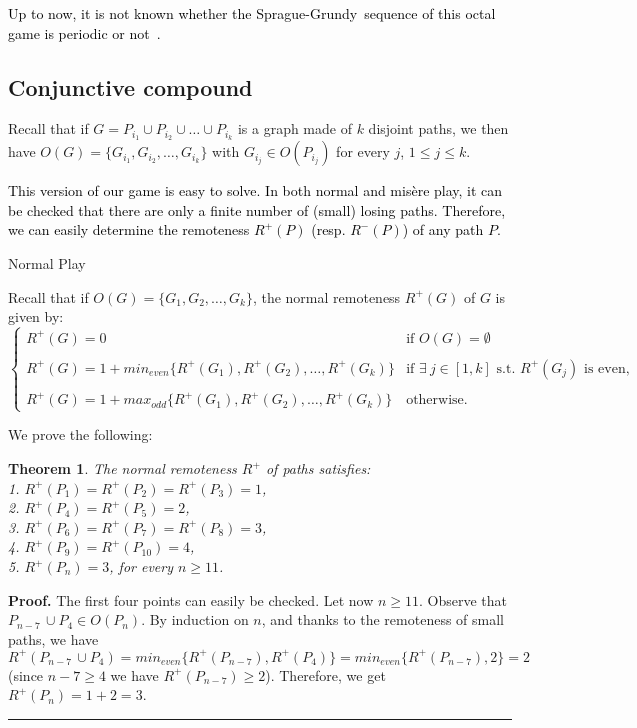 \documentclass[11pt]{article}
\newcommand{\modif}[1]{\textcolor{black}{#1}}
\newcommand{\centre}[1]{\begin{center}#1\end{center}}
\newcommand{\SP}{Sprague-Grundy}
\newtheorem{theorem}{Theorem}
\newcommand\qed{\mbox{}\hfill\rule{0.5em}{0.809em}\par\vskip 5mm}
\newenvironment{proof}[0]{\noindent\textbf{Proof.}}{\qed}
\begin{document}
\modif{
Up to now, it is not known whether the \SP\ sequence
of this octal game is periodic or not~\cite{WEB-FLAMMENKAMP}.
}

\subsection{Conjunctive compound}

Recall that if $G=P_{i_1}\cup P_{i_2}\cup\dots\cup P_{i_k}$ is a graph made of $k$ disjoint
paths, we then have $O(G)=\{G_{i_1}, G_{i_2},\dots,G_{i_k}\}$ with
$G_{i_j}\in O(P_{i_j})$ for every $j$, $1\le j\le k$.

\modif{This version of our game is easy to solve. In both normal
and mis\`ere play, it can be checked that there are
only a finite number of (small) losing paths.
Therefore, 
we can easily determine the remoteness 
$R^+(P)$ (resp. $R^-(P)$) of any path $P$. 
}


\vskip 4mm

\centre{{\sc Normal Play}}

\noindent
Recall that if $O(G)=\{G_1,G_2,\dots,G_k\}$, the normal remoteness $R^+(G)$
of $G$ is given by:
$$\left\{\begin{array}{ll}
 R^+(G)=0 & \mbox{if\ } O(G)=\emptyset \\
 \\
 R^+(G)=1+min_{even}\{R^+(G_1),R^+(G_2),\dots,R^+(G_k)\} &
    \mbox{if $\exists\ j\in[1,k]$ s.t. $R^+(G_j)$ is even,}\\
    \\
 R^+(G)=1+max_{odd}\{R^+(G_1),R^+(G_2),\dots,R^+(G_k)\} &
   \mbox{otherwise.}
\end{array}
\right.$$

We prove the following:

\begin{theorem}
The normal remoteness $R^+$ of paths satisfies:\\
1.  $R^+(P_1)=R^+(P_2)=R^+(P_3)=1$,\\
2. $R^+(P_4)=R^+(P_5)=2$,\\
3. $R^+(P_6)=R^+(P_7)=R^+(P_8)=3$,\\
4. $R^+(P_9)=R^+(P_{10})=4$,\\
5. $R^+(P_n)=3$, for every $n\ge 11$.
\end{theorem}

\begin{proof}
The first four points can easily be checked.
Let now $n\geq 11$. Observe that $P_{n-7}\,\cup P_4\in O(P_n)$. 
By induction on $n$, and thanks to the remoteness of small paths, we have
$R^+(P_{n-7}\,\cup P_4)=min_{even}\{ R^+(P_{n-7}), R^+(P_4)\}=min_{even}\{ R^+(P_{n-7}), 2\}=2$
(since $n-7\ge 4$ we have $R^+(P_{n-7})\ge 2$).
Therefore, we get $R^+(P_n)=1+2=3$.
\end{proof}
\end{document}
